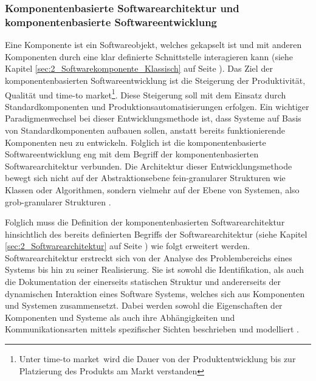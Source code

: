 \newpage
\subsubsection{Komponentenbasierte Softwarearchitektur und komponentenbasierte Softwareentwicklung}
\label{sec:2_Komponentenbasierte_Softwarearchitektur}
Eine Komponente ist ein Softwareobjekt, welches gekapselt ist und mit anderen Komponenten durch eine klar definierte Schnittstelle interagieren kann (siehe Kapitel \ref{sec:2_Softwarekomponente_Klassisch} auf Seite \pageref{sec:2_Softwarekomponente_Klassisch}). Das Ziel der komponentenbasierten Softwareentwicklung ist die Steigerung der Produktivität, Qualität und \glqq time-to market\footnote{Unter \glqq time-to market\grqq\ wird die Dauer von der Produktentwicklung bis zur Platzierung des Produkts am Markt verstanden}\grqq . Diese Steigerung soll mit dem Einsatz durch Standardkomponenten und Produktionsautomatisierungen erfolgen. Ein wichtiger Paradigmenwechsel bei dieser Entwicklungsmethode ist, dass Systeme auf Basis von Standardkomponenten aufbauen sollen, anstatt bereits funktionierende Komponenten neu zu entwickeln. Folglich ist die komponentenbasierte Softwareentwicklung eng mit dem Begriff der komponentenbasierten Softwarearchitektur verbunden. Die Architektur dieser Entwicklungsmethode bewegt sich nicht auf der Abstraktionsebene fein-granularer Strukturen wie Klassen oder Algorithmen, sondern vielmehr auf der Ebene von Systemen, also grob-granularer Strukturen \citereset \autocite[siehe][S. 452-468]{Sommerville.2011}.

Folglich muss die Definition der komponentenbasierten Softwarearchitektur hinsichtlich des bereits definierten Begriffs der Softwarearchitektur (siehe Kapitel \ref{sec:2_Softwarearchitektur} auf Seite \pageref{sec:2_Softwarearchitektur}) wie folgt erweitert werden.
Softwarearchitektur erstreckt sich von der Analyse des Problembereichs eines Systems bis hin zu seiner Realisierung. Sie ist sowohl die Identifikation, als auch die Dokumentation der einerseits statischen Struktur und andererseits der dynamischen Interaktion eines Software Systems, welches sich aus Komponenten und Systemen zusammensetzt. Dabei werden sowohl die Eigenschaften der Komponenten und Systeme als auch ihre Abhängigkeiten und Kommunikationsarten mittels spezifischer Sichten beschrieben und modelliert \citereset \autocite[siehe][S. 43]{Andresen.2003}.

